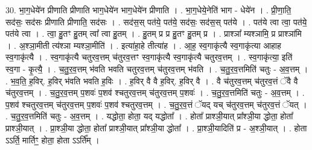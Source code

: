 \documentclass[17pt]{extarticle}
\begin{document}
30. भा॒ग॒धेये॑न प्रीणाति प्रीणाति भाग॒धेये॑न भाग॒धेये॑न प्रीणाति । . भा॒ग॒धेये॒नेति॑ भाग - धेये॑न । . प्री॒णा॒ति॒ सद॑सः॒ सद॑सः प्रीणाति प्रीणाति॒ सद॑सः । . सद॑स॒स् पत॑ये॒ पत॑ये॒ सद॑सः॒ सद॑स॒स् पत॑ये । . पत॑ये त्वा त्वा॒ पत॑ये॒ पत॑ये त्वा । . त्वा॒ हु॒तꣳ हु॒तम् त्वा᳚ त्वा हु॒तम् । . हु॒तम् प्र प्र हु॒तꣳ हु॒तम् प्र । . प्राश्ञा᳚ म्यश्ञामि॒ प्र प्राश्ञा॑मि । . अ॒श्ञा॒मीती त्य॑श्ञा म्यश्ञा॒मीति॑ । . इत्या॑हा॒हे तीत्या॑ह । . आ॒ह॒ स्व॒गाकृ॑त्यै स्व॒गाकृ॑त्या आहाह स्व॒गाकृ॑त्यै । . स्व॒गाकृ॑त्यै चतुरव॒त्तम् च॑तुरव॒त्तꣳ स्व॒गाकृ॑त्यै स्व॒गाकृ॑त्यै चतुरव॒त्तम् । . स्व॒गाकृ॑त्या॒ इति॑ स्व॒गा - कृ॒त्यै॒ । . च॒तु॒र॒व॒त्तम् भ॑वति भवति चतुरव॒त्तम् च॑तुरव॒त्तम् भ॑वति । . च॒तु॒र॒व॒त्तमिति॑ चतुः - अ॒व॒त्तम् । . भ॒व॒ति॒ ह॒विर्. ह॒विर् भ॑वति भवति ह॒विः । . ह॒विर् वै वै ह॒विर्. ह॒विर् वै । . वै च॑तुरव॒त्तम् च॑तुरव॒त्तं ॅवै वै च॑तुरव॒त्तम् । . च॒तु॒र॒व॒त्तम् प॒शवः॑ प॒शव॑ श्चतुरव॒त्तम् च॑तुरव॒त्तम् प॒शवः॑ । . च॒तु॒र॒व॒त्तमिति॑ चतुः - अ॒व॒त्तम् । . प॒शव॑ श्चतुरव॒त्तम् च॑तुरव॒त्तम् प॒शवः॑ प॒शव॑ श्चतुरव॒त्तम् । . च॒तु॒र॒व॒त्तं ॅयद् यच् च॑तुरव॒त्तम् च॑तुरव॒त्तं ॅयत् । . च॒तु॒र॒व॒त्तमिति॑ चतुः - अ॒व॒त्तम् । . यद्धोता॒ होता॒ यद् यद्धोता᳚ । . होता᳚ प्राश्ञी॒यात् प्रा᳚श्ञी॒या द्धोता॒ होता᳚ प्राश्ञी॒यात् । . प्रा॒श्ञी॒या द्धोता॒ होता᳚ प्राश्ञी॒यात् प्रा᳚श्ञी॒या द्धोता᳚ । . प्रा॒श्ञी॒यादिति॑ प्र - अ॒श्ञी॒यात् । . होता ऽऽर्ति॒ मार्तिꣳ॒॒ होता॒ होता ऽऽर्ति᳚म् । \newline
\end{document}
